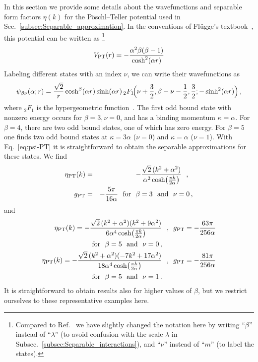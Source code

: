   In this section we provide some details about the wavefunctions and separable
  form factors $\eta(k)$ for the Pöschl--Teller potential used in
  Sec.~\ref{subsec:Separable_approximation}.  In the conventions of
  Fl\"{u}gge's textbook~\cite{Fluegge:1999}, this potential can be written as
  \footnote{Compared to Ref.~\cite{Fluegge:1999} we have slightly changed the
  notation here by writing
  ``$\beta$'' instead of ``$\lambda$'' (to avoid confusion with the scale
  $\lambda$ in Subsec.~\ref{subsec:Separable_interactions}), and ``$\nu$''
  instead of ``$m$'' (to label the states).}
  \begin{equation}
  V_{\text{PT}}(r) = -\frac{\alpha^2 \beta(\beta-1)}{\cosh^2(\alpha r)}
  \label{eq:V-PT-app}
  \end{equation}
  Labeling different states with an index $\nu$, we can write their
  wavefunctions as
  \begin{equation}
  \psi_{\beta\nu}(\alpha;r) = \frac{\sqrt{2}}{r}\cosh^\beta(\alpha r)
  \sinh(\alpha r) \,
  {_2F_1}\!\Bigl(\nu+\frac32,\beta-\nu-\frac12,\frac32;
  -\sinh^2(\alpha r)\Bigr) \,,
  \label{eq:psi-PT}
  \end{equation}
  where $_2F_1$ is the hypergeometric function~\cite{Olver:2010:NHMF}.
  The first odd bound state with nonzero energy occurs for $\beta=3,
  \nu=0$, and has a binding momentum $\kappa=\alpha$.  For $\beta=4$,
  there are two odd bound states, one of which has zero energy.  For
  $\beta=5$ one finds two odd bound states at $\kappa=3\alpha$ ($\nu=0$)
  and $\kappa=\alpha$ ($\nu=1$).  With Eq.~\eqref{eq:psi-PT} it is
  straightforward to obtain the separable approximations for these
  states.  We find
  \begin{eqnarray}
   \eta_{\text{PT}}(k) &=& -\frac{\sqrt{2}\,(k^2+\alpha^2)}
   {\alpha^2\cosh\!\left(\frac{\pi k}{2\alpha}\right)} \ \ \text{,}\ \ 
    \nonumber \\
   g_{\text{PT}} &=& -\frac{5\pi}{16\alpha}
   \ \ \text{for}\ \  \beta = 3 \ \ \text{and}\ \  \nu = 0 \,,
  \label{eq:eta-PT-3}
  \end{eqnarray}
  and
  \begin{subequations}%
  \begin{align}
   \eta_{\text{PT}}(k) = -\frac{\sqrt{2}\,(k^2+\alpha^2)(k^2+9\alpha^2)}
   {6\alpha^4\cosh\!\left(\frac{\pi k}{2\alpha}\right)} &\ \ \text{,}\ \ 
   g_{\text{PT}} = -\frac{63\pi}{256\alpha}
   \nonumber \\
   \ \ \text{for}\ \  \beta = 5 \ \ \text{and}\ \  \nu = 0 \,, \\
   \eta_{\text{PT}}(k) = -\frac{\sqrt{2}\,(k^2+\alpha^2)(-7k^2+17\alpha^2)}
   {18\alpha^4\cosh\!\left(\frac{\pi k}{2\alpha}\right)} &\ \ \text{,}\ \ 
   g_{\text{PT}} = -\frac{81\pi}{256\alpha}
   \nonumber \\
   \ \ \text{for}\ \  \beta = 5 \ \ \text{and}\ \  \nu = 1 \,.
  \end{align}
  \label{eq:eta-PT-5}%
  \end{subequations}%
  It is straightforward to obtain results also for higher values of $\beta$, but
  we restrict ourselves to these representative examples here.
